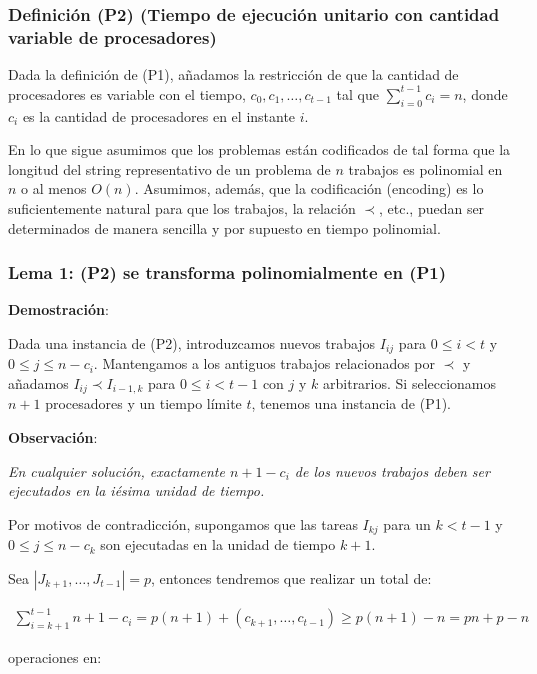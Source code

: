 \documentclass[14pt]{extarticle}
\begin{document}
\subsubsection*{Definición (P2) (Tiempo de ejecución unitario con cantidad variable de procesadores)}

Dada la definición de (P1), añadamos la restricción de que la cantidad de procesadores es variable con el tiempo, $c_0, c_1, \ldots, c_{t-1}$ tal que $\sum_{i = 0}^{t-1} c_i = n$, donde $c_i$ es la cantidad de procesadores en el instante $i$.

En lo que sigue asumimos que los problemas están codificados de tal forma que la longitud del string representativo de un problema de $n$ trabajos es polinomial en $n$ o al menos $O(n)$. Asumimos, además, que la codificación (encoding) es lo suficientemente natural para que los trabajos, la relación $\prec$, etc., puedan ser determinados de manera sencilla y por supuesto en tiempo polinomial.

\subsubsection*{Lema 1: (P2) se transforma polinomialmente en (P1)}

\textbf{Demostración}:

Dada una instancia de (P2), introduzcamos nuevos trabajos $I_{ij}$ para $0 \leq i < t$ y $0 \leq j \leq n - c_i$. Mantengamos a los antiguos trabajos relacionados por $\prec$ y añadamos $I_{ij} \prec I_{i-1, k}$ para $0 \leq i < t - 1$ con $j$ y $k$ arbitrarios. Si seleccionamos $n + 1$ procesadores y un tiempo límite $t$, tenemos una instancia de (P1).

\textbf{Observación}:

\textit{En cualquier solución, exactamente $n + 1 - c_i$ de los nuevos trabajos deben ser ejecutados en la iésima unidad de tiempo.}

Por motivos de contradicción, supongamos que las tareas $I_{kj}$ para un $k < t - 1$ y $0 \leq j \leq n - c_k$ son ejecutadas en la unidad de tiempo $k + 1$.

Sea $|{J_{k+1}, \ldots, J_{t-1}}| = p$, entonces tendremos que realizar un total de:

\begin{align*}
\sum_{i = k + 1}^{t - 1} n + 1 - c_i = p (n + 1) + (c_{k+1}, \ldots, c_{t-1}) \geq p(n + 1) - n = pn + p - n
\end{align*}

operaciones en:
\end{document}
